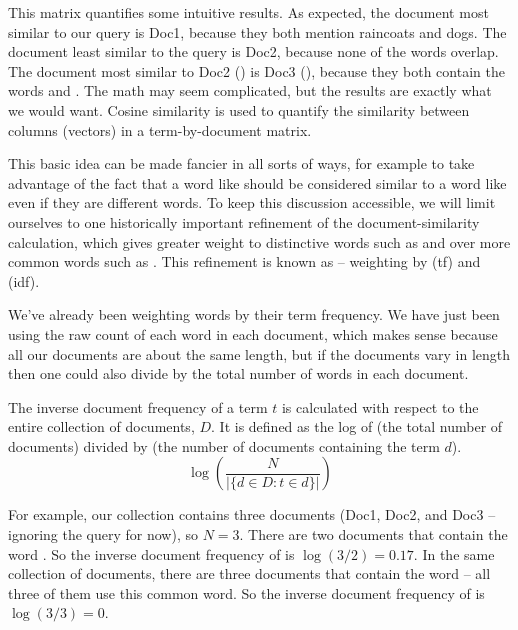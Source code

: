 This matrix quantifies some intuitive results.  As expected, the document most similar to our query is Doc1, because they both mention raincoats and dogs.  The document least similar to the query is Doc2, because none of the words overlap.  The document most similar to Doc2 () is Doc3 (), because they both contain the words  and .  The math may seem complicated, but the results are exactly what we would want.  Cosine similarity is used to quantify the similarity between columns (vectors) in a term-by-document matrix.

This basic idea can be made fancier in all sorts of ways, for example to take advantage of the fact that a word like  should be considered similar to a word like  even if they are different words.
  To keep this discussion accessible, we will limit ourselves to one historically important refinement of the document-similarity calculation, which gives greater weight to distinctive words such as  and  over more common words such as .  This refinement is known as  -- weighting by  (tf) and  (idf).
  
We've already been weighting words by their term frequency.  We have just been using the raw count of each word in each document, which makes sense because all our documents are about the same length, but if the documents vary in length then one could also divide by the total number of words in each document.

\newpage
The inverse document frequency of a term $t$ is calculated with respect to the entire collection of documents, $D$.   It is defined as the log of (the total number of documents) divided by (the number of documents containing the term $d$).
\begin{equation}
 \log\left(\frac{N}{|\{d \in D : t \in d\}|}\right)
\end{equation}

For example, our collection contains three documents (Doc1, Doc2, and Doc3 -- ignoring the query for now), so $N = 3$.  There are two documents that contain the word .  So the inverse document frequency of  is $\log(3/2) = 0.17$.  In the same collection of documents, there are three documents that contain the word  -- all three of them use this common word.  So the inverse document frequency of  is $\log(3/3) = 0$.

